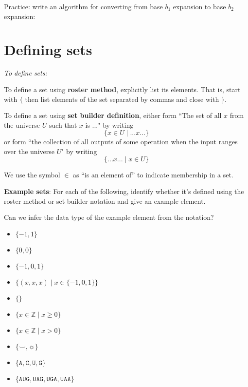 \documentclass[12pt, oneside]{article}
\newcommand{\A}[0]{\texttt{A}}
\newcommand{\C}[0]{\texttt{C}}
\newcommand{\G}[0]{\texttt{G}}
\newcommand{\U}[0]{\texttt{U}}
\begin{document}
Practice: write an algorithm for converting from base $b_1$ expansion to base $b_2$ expansion:

\phantom{
Earlier, we saw (two different) algorithms for, given 
a target base $b$, converting from decimal to base $b$ expansions. 
We will use either one of these as a subroutine in this algorithm.\\
Given a base expansion in base $b_1$:\\
Step 1: Use the definition of base expansion to calculate the value of
    this number (in decimal).\\
Step 2: Use the Least Significant First algorithm to write this value in 
    base $b_2$ and output the result.
}
\vspace{200pt} \vfill
\section*{Defining sets}


{\it To define sets:}

To define a set using {\bf roster method}, explicitly list its elements. That is,
start with $\{$ then list elements of 
the set separated by commas and close with $\}$.

\vfill

To define a set using {\bf set builder definition}, either form 
``The set of all $x$ from the universe $U$ such that $x$ is ..." by writing
\[\{x \in U \mid ...x... \}\]
or form ``the collection of all outputs of some operation when the input ranges over the universe $U$"
by writing
\[\{ ...x... \mid x\in U \}\]

\vfill

We use the symbol $\in$ as ``is an element of'' to indicate membership in a set.\\

\newpage 

{\bf Example sets}: For each of the following, identify whether it's defined using the roster method
or set builder notation and give an example element.

Can we infer the data type of the example element from the notation?

\begin{itemize}
    \item[]$\{ -1, 1\}$
    \vfill
    \item[]$\{0, 0 \}$
    \vfill
    \item[]$\{-1, 0, 1 \}$
    \vfill
    \item[]$\{(x,x,x) \mid x \in \{-1,0,1\} \}$
    \vfill
    \item[]$\{ \}$
    \vfill
    \item[]$\{ x \in \mathbb{Z} \mid x \geq 0 \}$
    \vfill
    \item[]$\{ x \in \mathbb{Z}  \mid x > 0 \}$
    \vfill
    \item[]$\{ \smile, \sun \}$
    \vfill
    \item[]$\{\A,\C,\U,\G\}$
    \vfill
    \item[]$\{\A\U\G, \U\A\G, \U\G\A, \U\A\A \}$
    \vfill
\end{itemize}
 \vfill
\end{document}
